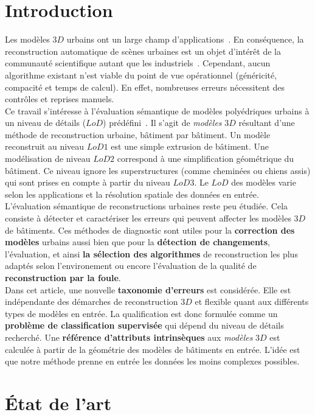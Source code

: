\documentclass[a4paper,french]{article}
\begin{document}
    \section{Introduction}
    Les modèles $3D$ urbains ont un large champ d'applications~\cite{Biljecki2015}. En conséquence, la reconstruction automatique de scènes urbaines est un objet d'intérêt de la communauté scientifique autant que les industriels~\cite{Musialski2012}. Cependant, aucun algorithme existant n'est viable du point de vue opérationnel {\color{black}(généricité, compacité et temps de calcul)}. En effet, nombreuses erreurs nécessitent des contrôles et reprises manuels.\\
    Ce travail s'intéresse à l'évaluation sémantique de modèles polyédriques urbains à un niveau de détails ($LoD$) prédéfini~\cite{kolbe2005citygml}. Il s'agit de \textit{modèles} $3D$ résultant d'une méthode de reconstruction urbaine, bâtiment par bâtiment. Un modèle reconstruit au niveau $LoD 1$ est une simple extrusion de bâtiment. Une modélisation de niveau $LoD 2$ correspond à une simplification géométrique du bâtiment. Ce niveau ignore les superstructures (comme cheminées ou chiens assis) qui sont prises en compte à partir du niveau $LoD 3$. Le $LoD$ des modèles varie selon les applications et la résolution spatiale des données en entrée.\\
    L'évaluation sémantique de reconstructions urbaines reste peu étudiée. Cela consiste à détecter et caractériser les erreurs qui peuvent affecter les modèles $3D$ de bâtiments. Ces méthodes de diagnostic {\color{black}sont utiles} pour la \textbf{correction des modèles} urbains aussi bien que pour la \textbf{détection de changements}, l'évaluation, et ainsi \textbf{la sélection des algorithmes} de reconstruction les plus adaptés selon l'environement ou encore l'évaluation de la qualité de \textbf{reconstruction par la foule}.\\
    Dans cet article, une nouvelle \textbf{taxonomie d'erreurs} est considérée. Elle est indépendante des démarches de reconstruction $3D$ et flexible quant aux différents types de modèles en entrée. La qualification est donc formulée comme un \textbf{problème de classification supervisée} qui dépend du niveau de détails recherché. Une \textbf{référence d'attributs intrinsèques} {\color{black}aux \textit{modèles} $3D$} est calculée à partir de la géométrie des modèles de bâtiments en entrée. L'idée est que notre méthode prenne en entrée les données les moins complexes possibles.

    \section{\'Etat de l'art}
\end{document}
